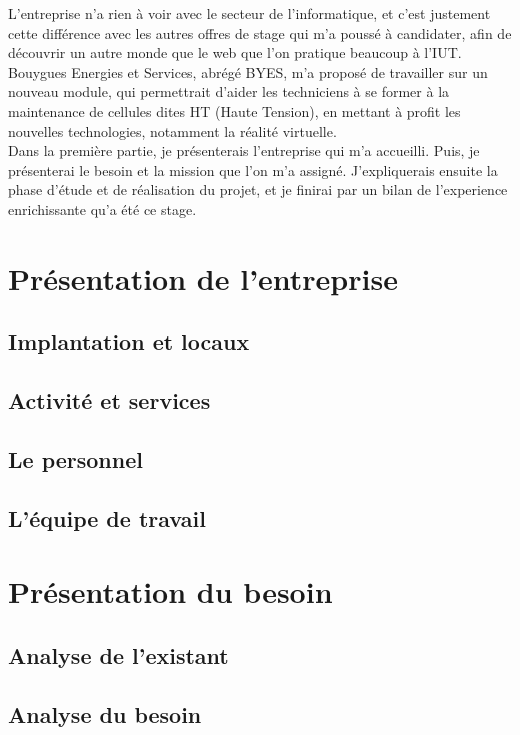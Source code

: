 \documentclass[a4paper]{article}
\begin{document}
    L'entreprise n'a rien à voir avec le secteur de l'informatique, et c'est justement cette différence avec les autres offres de stage qui m'a poussé à candidater, afin de découvrir un autre monde que le web que l'on pratique beaucoup à l'IUT. \\
    
    Bouygues Energies et Services, abrégé BYES, m'a proposé de travailler sur un nouveau module, qui permettrait d'aider les techniciens à se former à la maintenance de cellules dites HT (Haute Tension), en mettant à profit les nouvelles technologies, notamment la réalité virtuelle. \\

    Dans la première partie, je présenterais l'entreprise qui m'a accueilli. Puis, je présenterai le besoin et la mission que l'on m'a assigné. J'expliquerais ensuite la phase d'étude et de réalisation du projet, et je finirai par un bilan de l'experience enrichissante qu'a été ce stage. \\

    \newpage 
    \section{Présentation de l'entreprise}
    \subsection{Implantation et locaux}
    \subsection{Activité et services}
    \subsection{Le personnel}
    \subsection{L'équipe de travail}
    
    \section{Présentation du besoin}
    \subsection{Analyse de l'existant}
    \subsection{Analyse du besoin}
\end{document}
